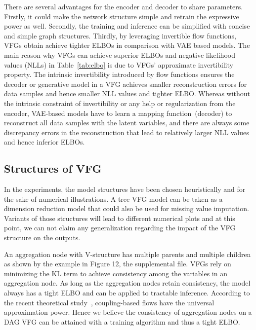 \documentclass[twoside]{article}
\begin{document}
 There are several advantages for the encoder and decoder to share parameters. Firstly, it could make the network structure simple and retrain the expressive power as well. Secondly, the training and inference can be simplified with concise and simple graph structures. Thirdly, by leveraging invertible flow functions, VFGs obtain achieve tighter ELBOs in comparison with VAE based models. The main reason why VFGs can achieve superior ELBOs and negative likelihood values (NLLs) in Table~\ref{tab:elbo} is due to VFGs' approximate invertibility property. The intrinsic invertibility introduced by flow functions ensures the decoder or generative model in a VFG  achieves smaller reconstruction errors for data samples and hence smaller NLL values and tighter ELBO. Whereas without the intrinsic constraint of invertibility or any help or regularization from the encoder, VAE-based models have to learn a  mapping function~(decoder) to reconstruct all data samples with the latent variables, and there are always some discrepancy errors in the reconstruction that lead to relatively larger NLL values and hence inferior ELBOs.

\subsection{Structures of VFG}
 
  
 In the experiments, the model structures have been chosen heuristically and for the sake of numerical illustrations. A tree VFG model can be taken as a dimension reduction model that could also be used for missing value imputation.  Variants of those structures will lead to different numerical plots and at this point, we can not claim any generalization regarding the impact of the VFG structure on the outputs.
 
 An aggregation node with V-structure has multiple parents and multiple children as shown by the example in  Figure 12, the supplemental file. VFGs rely on minimizing the KL term to achieve consistency among the variables in an aggregation node. As long as the aggregation nodes retain consistency, the model always has a tight ELBO and can be applied to tractable inference. According to the recent theoretical study~\cite{teshima2020coupling}, coupling-based flows have the universal approximation power. Hence we believe the consistency of aggregation nodes on a DAG VFG can be attained with a training algorithm and thus a tight ELBO. 


\vspace{-0.1in}
\end{document}
